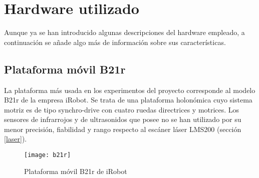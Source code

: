 
\chapter{Hardware utilizado}\label{ap:hardware}
Aunque ya se han introducido algunas descripciones del hardware empleado, a continuación se añade algo más de información sobre sus características.

\section{Plataforma móvil B21r}
La plataforma más usada en los experimentos del proyecto corresponde al modelo B21r de la empresa iRobot. Se trata de una plataforma holonómica cuyo sistema motriz es de tipo synchro-drive con cuatro ruedas directrices y motrices. Los sensores de infrarrojos y de ultrasonidos que posee no se han utilizado por su menor precisión, fiabilidad y rango respecto al escáner láser LMS200 (sección \ref{laser}).

\begin{figure}[h]
  \centering\texttt{[image: b21r]}\\
  \caption{Plataforma móvil B21r de iRobot}\label{fg:b21r}
\end{figure}

